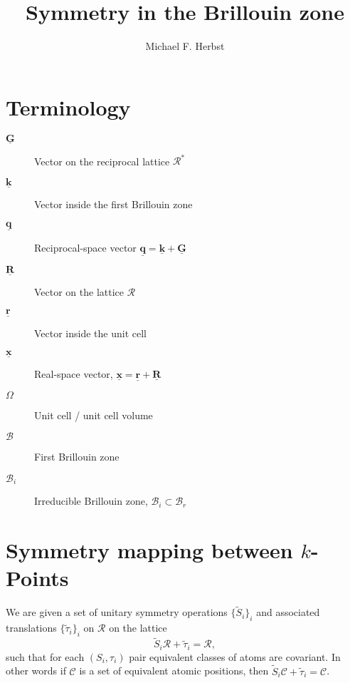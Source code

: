 \documentclass[a4paper]{article}
\renewcommand*{\vec}[1]{\ensuremath{\underline{\boldsymbol{#1}}}}
\begin{document}
\title{Symmetry in the Brillouin zone}
\author{Michael F. Herbst}
\maketitle


\section{Terminology}
\begin{description}
	\item[$\vec{G}$] Vector on the reciprocal lattice $\mathcal{R}^\ast$
	\item[$\vec{k}$] Vector inside the first Brillouin zone
	\item[$\vec{q}$] Reciprocal-space vector $\vec{q} = \vec{k} + \vec{G}$
	\item[$\vec{R}$] Vector on the lattice $\mathcal{R}$
	\item[$\vec{r}$] Vector inside the unit cell
	\item[$\vec{x}$] Real-space vector, $\vec{x} = \vec{r} + \vec{R}$
	\item[$\Omega$] Unit cell / unit cell volume
	\item[$\mathcal{B}$] First Brillouin zone
	\item[$\mathcal{B}_i$] Irreducible Brillouin zone,
		$\mathcal{B}_i \subset \mathcal{B}_r$
\end{description}

\section{Symmetry mapping between $k$-Points}
We are given a set of unitary symmetry operations $\{\tilde{S}_i\}_i$
and associated translations $\{\tilde{\tau}_i\}_i$ on $\mathcal{R}$
on the lattice
\[
	\tilde{S}_i \mathcal{R} + \tilde{\tau}_i = \mathcal{R},
\]
such that for each $\left( S_i, \tau_i \right)$ pair
equivalent classes of atoms are covariant.
In other words if $\mathcal{C}$ is a set of equivalent atomic positions,
then $\tilde{S}_i \mathcal{C} + \tilde{\tau}_i = \mathcal{C}$.
\end{document}

